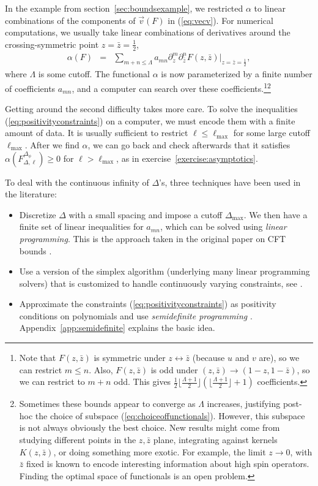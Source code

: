 \documentclass{ws-rv9x6}
\newcommand\be{\begin{eqnarray}}
\newcommand\ee{\end{eqnarray}}
\newcommand\f\phi
\newcommand\ptl\partial
\newcommand\<\langle
\renewcommand\>\rangle
\renewcommand\.{\cdot}
\newcommand\De{\Delta}
\begin{document}
In the example from section~\ref{sec:boundsexample}, we restricted $\alpha$ to linear combinations of the components of $\vec v(F)$ in (\ref{eq:vecv}).  For numerical computations, we usually take linear combinations of derivatives around the crossing-symmetric point $z=\bar z = \frac 1 2$,
\be
\label{eq:choiceoffunctionals}
\alpha(F) &=& \sum_{m+n\leq \Lambda} a_{mn}\ptl_z^m \ptl_{\bar z}^n F(z,\bar z)|_{z=\bar z=\frac 1 2},
\ee
where $\Lambda$ is some cutoff.  The functional $\alpha$ is now parameterized by a finite number of coefficients $a_{mn}$, and a computer can search over these coefficients.\footnote{Note that $F(z,\bar z)$ is symmetric under $z\leftrightarrow \bar z$ (because $u$ and $v$ are), so we can restrict $m\leq n$.  Also, $F(z,\bar z)$ is odd under $(z,\bar z)\to (1-z,1-\bar z)$, so we can restrict to $m+n$ odd. This gives $\frac 1 2\lfloor \frac{\Lambda+1}{2}\rfloor(\lfloor \frac{\Lambda+1}{2}\rfloor+1)$ coefficients.}\footnote{Sometimes these bounds appear to converge as $\Lambda$ increases, justifying post-hoc the choice of subspace (\ref{eq:choiceoffunctionals}).  However, this subspace is not always obviously the best choice.  New results might come from studying different points in the $z,\bar z$ plane, integrating against kernels $K(z,\bar z)$, or doing something more exotic.  For example, the limit $z\to 0$, with $\bar z$ fixed is known to encode interesting information about high spin operators. Finding the optimal space of functionals is an open problem.}

Getting around the second difficulty takes more care.  To solve the inequalities (\ref{eq:positivityconstraints}) on a computer, we must encode them with a finite amount of data.  It is usually sufficient to restrict $\ell\leq \ell_\mathrm{max}$ for some large cutoff $\ell_\mathrm{max}$.  After we find $\alpha$, we can go back and check afterwards that it satisfies $\alpha(F_{\De,\ell}^{\De_\f})\geq 0$ for $\ell>\ell_\mathrm{max}$, as in exercise~\ref{exercise:asymptotics}.

To deal with the continuous infinity of $\De$'s, three techniques have been used in the literature:
\begin{itemize}
\item Discretize $\De$ with a small spacing and impose a cutoff $\De_\mathrm{max}$.  We then have a finite set of linear inequalities for $a_{mn}$, which can be solved using {\it linear programming}.  This is the approach taken in the original paper on CFT bounds \cite{Rattazzi:2008pe}.

\item Use a version of the simplex algorithm (underlying many linear programming solvers) that is customized to handle continuously varying constraints, see \cite{El-Showk:2014dwa,Paulos:2014vya}.

\item Approximate the constraints (\ref{eq:positivityconstraints}) as positivity conditions on polynomials and use {\it semidefinite programming} \cite{Poland:2011ey,Kos:2013tga,Kos:2014bka,Simmons-Duffin:2015qma}.  Appendix~\ref{app:semidefinite} explains the basic idea.

\end{itemize}
\end{document}
